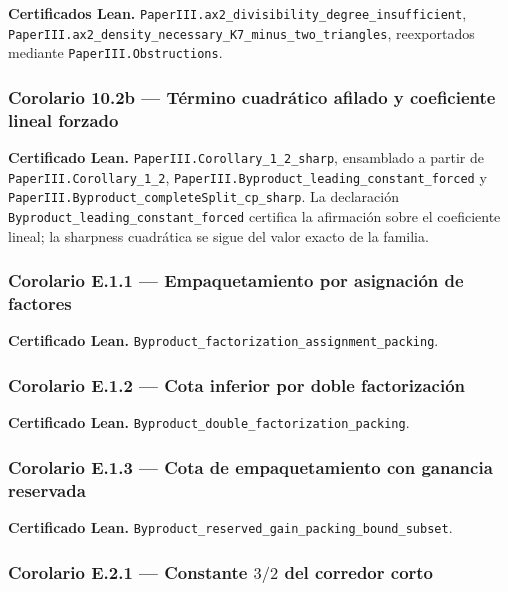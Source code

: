 \documentclass[spanish,11pt,a4paper]{article}
\begin{document}
\textbf{Certificados Lean.}
\nolinkurl{PaperIII.ax2_divisibility_degree_insufficient},
\nolinkurl{PaperIII.ax2_density_necessary_K7_minus_two_triangles},
reexportados mediante \nolinkurl{PaperIII.Obstructions}.

\subsubsection{Corolario 10.2b --- Término cuadrático afilado y
coeficiente lineal
forzado}\label{corolario-10.2b-tuxe9rmino-cuadruxe1tico-afilado-y-coeficiente-lineal-forzado}

\textbf{Certificado Lean.} \nolinkurl{PaperIII.Corollary_1_2_sharp},
ensamblado a partir de \nolinkurl{PaperIII.Corollary_1_2},
\nolinkurl{PaperIII.Byproduct_leading_constant_forced} y
\nolinkurl{PaperIII.Byproduct_completeSplit_cp_sharp}. La declaración
\nolinkurl{Byproduct_leading_constant_forced} certifica la afirmación
sobre el coeficiente lineal; la sharpness cuadrática se sigue del valor
exacto de la familia.

\subsubsection{Corolario E.1.1 --- Empaquetamiento por asignación de
factores}\label{corolario-e.1.1-empaquetamiento-por-asignaciuxf3n-de-factores}

\textbf{Certificado Lean.}
\nolinkurl{Byproduct_factorization_assignment_packing}.

\subsubsection{Corolario E.1.2 --- Cota inferior por doble
factorización}\label{corolario-e.1.2-cota-inferior-por-doble-factorizaciuxf3n}

\textbf{Certificado Lean.}
\nolinkurl{Byproduct_double_factorization_packing}.

\subsubsection{Corolario E.1.3 --- Cota de empaquetamiento con ganancia
reservada}\label{corolario-e.1.3-cota-de-empaquetamiento-con-ganancia-reservada}

\textbf{Certificado Lean.}
\nolinkurl{Byproduct_reserved_gain_packing_bound_subset}.

\subsubsection{\texorpdfstring{Corolario E.2.1 --- Constante \(3/2\) del
corredor
corto}{Corolario E.2.1 --- Constante 3/2 del corredor corto}}\label{corolario-e.2.1-constante-32-del-corredor-corto}
\end{document}
